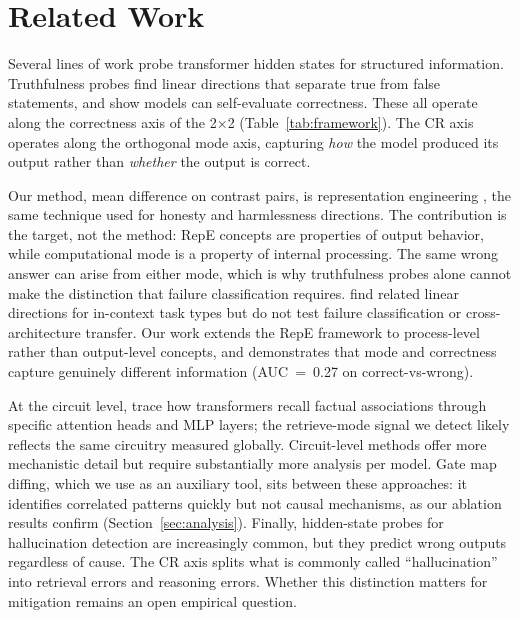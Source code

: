 \documentclass[11pt]{article}
\begin{document}
\section{Related Work}

Several lines of work probe transformer hidden states for structured information. Truthfulness probes \citep{li2023iti, burns2022discovering, marks2024geometry, azaria2023internal} find linear directions that separate true from false statements, and \citet{kadavath2022language} show models can self-evaluate correctness. These all operate along the correctness axis of the 2$\times$2 (Table~\ref{tab:framework}). The CR axis operates along the orthogonal mode axis, capturing \emph{how} the model produced its output rather than \emph{whether} the output is correct.

Our method, mean difference on contrast pairs, is representation engineering \citep{zou2023representation}, the same technique used for honesty and harmlessness directions. The contribution is the target, not the method: RepE concepts are properties of output behavior, while computational mode is a property of internal processing. The same wrong answer can arise from either mode, which is why truthfulness probes alone cannot make the distinction that failure classification requires. \citet{todd2024function} find related linear directions for in-context task types but do not test failure classification or cross-architecture transfer. Our work extends the RepE framework to process-level rather than output-level concepts, and demonstrates that mode and correctness capture genuinely different information (AUC~=~0.27 on correct-vs-wrong).

At the circuit level, \citet{geva2023dissecting} trace how transformers recall factual associations through specific attention heads and MLP layers; the retrieve-mode signal we detect likely reflects the same circuitry measured globally. Circuit-level methods \citep{nanda2023grokking, conmy2023automated, elhage2022superposition} offer more mechanistic detail but require substantially more analysis per model. Gate map diffing, which we use as an auxiliary tool, sits between these approaches: it identifies correlated patterns quickly but not causal mechanisms, as our ablation results confirm (Section~\ref{sec:analysis}). Finally, hidden-state probes for hallucination detection are increasingly common, but they predict wrong outputs regardless of cause. The CR axis splits what is commonly called ``hallucination'' into retrieval errors and reasoning errors. Whether this distinction matters for mitigation remains an open empirical question.
\end{document}
